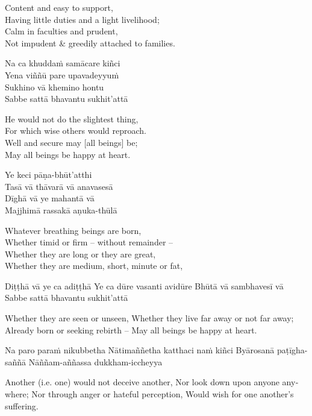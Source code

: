 \begin{english}
  Content and easy to support,\\
  Having little duties and a light livelihood;\\
  Calm in faculties and prudent,\\
  Not impudent \& greedily attached to families.
\end{english}

Na ca khuddaṁ samācare kiñci\\
Yena viññū pare upavadeyyuṁ\\
Sukhino vā khemino hontu\\
Sabbe sattā bhavantu sukhit’attā

\begin{english}
  He would not do the slightest thing,\\
  For which wise others would reproach.\\
  Well and secure may [all beings] be;\\
  May all beings be happy at heart.
\end{english}

Ye keci pāṇa-bhūt’atthi\\
Tasā vā thāvarā vā anavasesā\\
Dīghā vā ye mahantā vā\\
Majjhimā rassakā aṇuka-thūlā

\begin{english}
  Whatever breathing beings are born,\\
  Whether timid or firm – without remainder –\\
  Whether they are long or they are great,\\
  Whether they are medium, short, minute or fat,
\end{english}

Diṭṭhā vā ye ca adiṭṭhā
Ye ca dūre vasanti avidūre
Bhūtā vā sambhavesī vā
Sabbe sattā bhavantu sukhit’attā

\begin{english}
  Whether they are seen or unseen,
  Whether they live far away or not far away;
  Already born or seeking rebirth –
  May all beings be happy at heart.
\end{english}

Na paro paraṁ nikubbetha
Nātimaññetha katthaci naṁ kiñci
Byārosanā paṭīgha-saññā
Nāññam-aññassa dukkham-iccheyya

\begin{english}
  Another (i.e. one) would not deceive another,
  Nor look down upon anyone anywhere;
  Nor through anger or hateful perception,
  Would wish for one another’s suffering.
\end{english}

